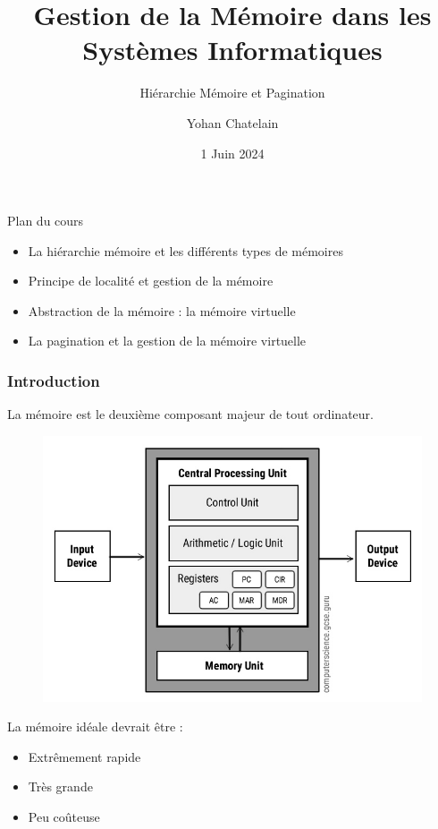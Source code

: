 \documentclass[8pt]{beamer}
\title{Gestion de la Mémoire dans les Systèmes Informatiques}
\subtitle{Hiérarchie Mémoire et Pagination}
\author{Yohan Chatelain}
\institute{Polytechnique Montr\'eal}
\date{1 Juin 2024}
\begin{document}
\begin{frame}
    \titlepage
\end{frame}

\begin{frame}{Plan du cours}
    \begin{itemize}
        \item La hiérarchie mémoire et les différents types de mémoires
        \item Principe de localité et gestion de la mémoire
        \item Abstraction de la mémoire : la mémoire virtuelle
        \item La pagination et la gestion de la mémoire virtuelle
    \end{itemize}
\end{frame}

\begin{frame}
    \frametitle{Introduction}
    La mémoire est le deuxième composant majeur de tout ordinateur.
    \begin{figure}
        \centering

        \includegraphics[width=.45\textwidth]{figures/Von-Neumann-Architecture-Diagram.jpg}
        \label{fig:sub1}
    \end{figure}
    \begin{block}{La mémoire idéale devrait être :}
        \begin{itemize}
            \item Extrêmement rapide
            \item Très grande
            \item Peu coûteuse
        \end{itemize}
    \end{block}

\end{frame}
\end{document}
